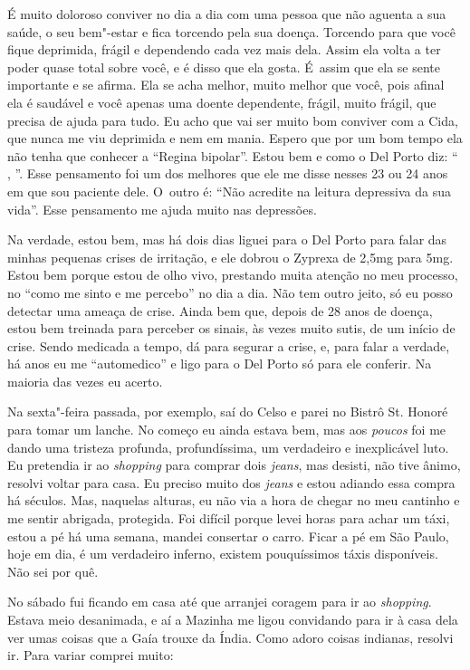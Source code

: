 É muito doloroso conviver no dia a dia com uma pessoa que não aguenta a
sua saúde, o seu bem"-estar e fica torcendo pela sua doença. Torcendo
para que você fique deprimida, frágil e dependendo cada vez mais dela.
Assim ela volta a ter poder quase total sobre você, e é disso que ela
gosta. É~assim que ela se sente importante e se afirma. Ela se acha
melhor, muito melhor que você, pois afinal ela é saudável e você apenas
uma doente dependente, frágil, muito frágil, que precisa de ajuda para
tudo. Eu acho que vai ser muito bom conviver com a Cida, que nunca me
viu deprimida e nem em mania. Espero que por um bom tempo ela não tenha
que conhecer a ``Regina bipolar''. Estou bem e como o Del Porto diz:
``  ,  ''. Esse pensamento foi um dos melhores
que ele me disse nesses 23 ou 24 anos em que sou paciente dele. O~outro
é: ``Não acredite na leitura depressiva da sua vida''. Esse pensamento
me ajuda muito nas depressões.

Na verdade, estou bem, mas há dois dias liguei para o Del Porto para
falar das minhas pequenas crises de irritação, e ele dobrou o Zyprexa de
2,5mg para 5mg. Estou bem porque estou de olho vivo, prestando muita
atenção no meu processo, no ``como me sinto e me percebo'' no dia a dia.
Não tem outro jeito, só eu posso detectar uma ameaça de crise. Ainda bem
que, depois de 28 anos de doença, estou bem treinada para perceber os
sinais, às vezes muito sutis, de um início de crise. Sendo medicada a
tempo, dá para segurar a crise, e, para falar a verdade, há anos eu me
``automedico'' e ligo para o Del Porto só para ele conferir. Na maioria
das vezes eu acerto.

Na sexta"-feira passada, por exemplo, saí do Celso e parei no Bistrô St.
Honoré para tomar um lanche. No começo eu ainda estava bem, mas aos
\emph{poucos} foi me dando uma tristeza profunda, profundíssima, um
verdadeiro e inexplicável luto. Eu pretendia ir ao \emph{shopping} para
comprar dois \emph{jeans}, mas desisti, não tive ânimo, resolvi voltar
para casa. Eu preciso muito dos \emph{jeans} e estou adiando essa compra
há séculos. Mas, naquelas alturas, eu não via a hora de chegar no meu
cantinho e me sentir abrigada, protegida. Foi difícil porque levei horas
para achar um táxi, estou a pé há uma semana, mandei consertar o carro.
Ficar a pé em São Paulo, hoje em dia, é um verdadeiro inferno, existem
pouquíssimos táxis disponíveis. Não sei por quê.

No sábado fui ficando em casa até que arranjei coragem para ir ao
\emph{shopping}. Estava meio desanimada, e aí a Mazinha me ligou
convidando para ir à casa dela ver umas coisas que a Gaía trouxe da
Índia. Como adoro coisas indianas, resolvi ir. Para variar comprei
muito:

